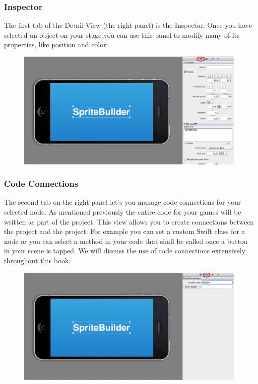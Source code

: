\newpage{}
\subsubsection{Inspector}
The first tab of the Detail View (the right panel) is
the Inspector. Once you have selected an object on your stage you can use this panel to modify many of its properties, like position and color:
\begin{figure}[H]
		\centering
		\includegraphics[width=0.95\linewidth]{images/spritebuilder/spritebuilder_inspector.png}     
\end{figure} 

\newpage{}
\subsubsection{Code Connections} 
The second tab on the right panel let's you manage code connections for your
selected node. As mentioned previously the entire code for your games will be
written as part of the \xcode{} project. This view allows you to create
connections between the \xcode{} project and the \SB{} project. For example you
can set a custom Swift class for a node or you can select a method in your code
that shall be called once a button in your scene is tapped. We will discuss the
use of code connections extensively throughout this book.
\begin{figure}[H]
		\centering
		\includegraphics[width=0.95\linewidth]{images/spritebuilder/spritebuilder_codeconnections.png}     
\end{figure} 

